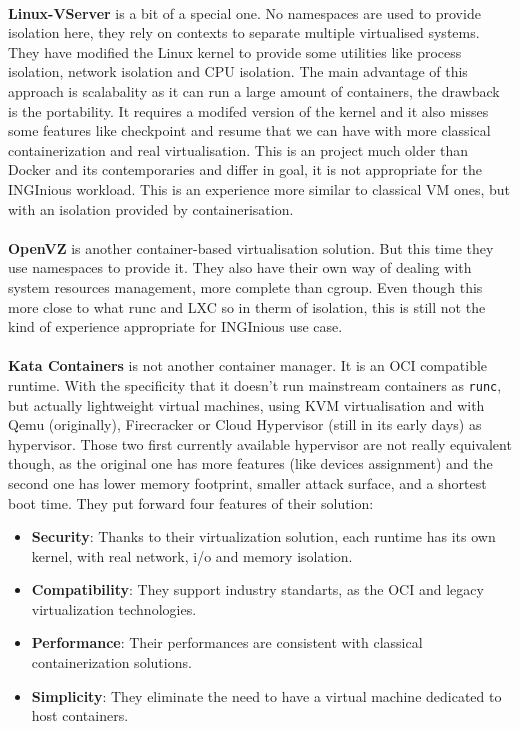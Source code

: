 \paragraph{}\textbf{Linux-VServer}\cite{linux-vserver} is a bit of a special one.  No namespaces are used to provide isolation here, they rely on contexts to separate multiple virtualised systems.  They have modified the Linux kernel to provide some utilities like process isolation, network isolation and CPU isolation.  The main advantage of this approach is scalabality as it can run a large amount of containers, the drawback is the portability.  It requires a modifed version of the kernel and it also misses some features like checkpoint and resume that we can have with more classical containerization and real virtualisation.  This is an project much older than Docker and its contemporaries and differ in goal, it is not appropriate for the INGInious workload.  This is an experience more similar to classical VM ones, but with an isolation provided by containerisation.

\paragraph{}\textbf{OpenVZ}\cite{openvz} is another container-based virtualisation solution.  But this time they use namespaces to provide it.  They also have their own way of dealing with system resources management, more complete than cgroup.  Even though this more close to what runc and LXC so in therm of isolation, this is still not the kind of experience appropriate for INGInious use case.

\paragraph{}\textbf{Kata Containers} is not another container manager.  It is an OCI compatible runtime.  With the specificity that it doesn't run mainstream containers as \texttt{runc}, but actually lightweight virtual machines, using KVM virtualisation and with Qemu (originally), Firecracker or Cloud Hypervisor (still in its early days) as hypervisor.  Those two first currently available hypervisor are not really equivalent though, as the original one has more features (like devices assignment) and the second one has lower memory footprint, smaller attack surface, and a shortest boot time.
They put forward four features of their solution:
\begin{itemize}
\renewcommand\labelitemi{--}
  \item \textbf{Security}: Thanks to their virtualization solution, each runtime has its own kernel, with real network, i/o and memory isolation.
  \item \textbf{Compatibility}:  They support industry standarts, as the OCI\cite{oci} and legacy virtualization technologies.
  \item \textbf{Performance}:  Their performances are consistent with classical containerization solutions.
  \item \textbf{Simplicity}:  They eliminate the need to have a virtual machine dedicated to host containers.
\end{itemize}

